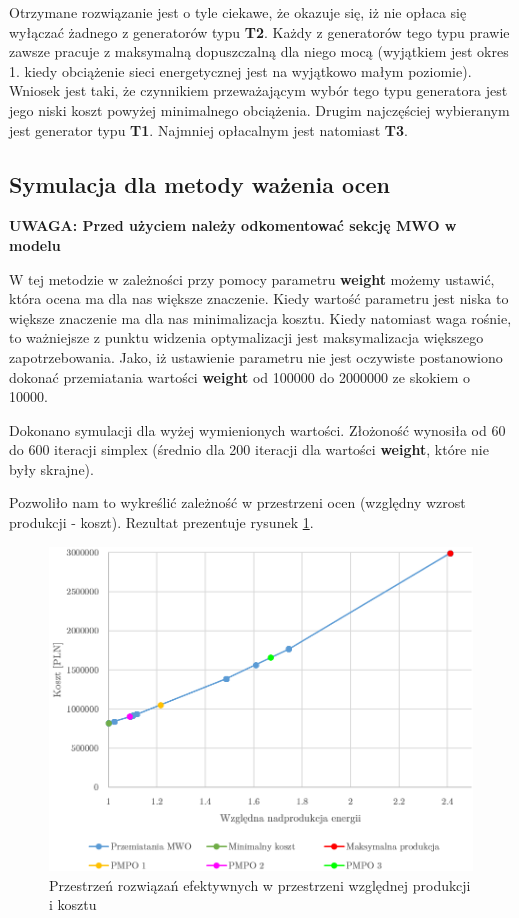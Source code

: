 \documentclass[12pt, twoside, hidelinks, a4paper]{article}
\begin{document}
Otrzymane rozwiązanie jest o tyle ciekawe, że okazuje się, iż nie opłaca się wyłączać żadnego z generatorów typu \textbf{T2}. Każdy z generatorów tego typu prawie zawsze pracuje z maksymalną dopuszczalną dla niego mocą (wyjątkiem jest okres 1. kiedy obciążenie sieci energetycznej jest na wyjątkowo małym poziomie). Wniosek jest taki, że czynnikiem przeważającym wybór tego typu generatora jest jego niski koszt powyżej minimalnego obciążenia. Drugim najczęściej wybieranym jest generator typu \textbf{T1}. Najmniej opłacalnym jest natomiast \textbf{T3}.

\subsection{Symulacja dla metody ważenia ocen} \label{sec:weight}
\textbf{UWAGA: Przed użyciem należy odkomentować sekcję MWO w modelu}

W tej metodzie w zależności przy pomocy parametru \textbf{weight} możemy ustawić, która ocena ma dla nas większe znaczenie. Kiedy wartość parametru jest niska to większe znaczenie ma dla nas minimalizacja kosztu. Kiedy natomiast waga rośnie, to ważniejsze z punktu widzenia optymalizacji jest maksymalizacja większego zapotrzebowania. Jako, iż ustawienie parametru nie jest oczywiste postanowiono dokonać przemiatania wartości \textbf{weight} od 100000 do 2000000 ze skokiem o 10000.

Dokonano symulacji dla wyżej wymienionych wartości. Złożoność wynosiła od 60 do 600 iteracji simplex (średnio dla 200 iteracji dla wartości \textbf{weight}, które nie były skrajne).

Pozwoliło nam to wykreślić zależność w przestrzeni ocen (względny wzrost produkcji - koszt). Rezultat prezentuje rysunek \ref{fig:plot}.

\begin{figure}[H]
\centering
\includegraphics[scale=0.4]{plot_new.png}
\caption{Przestrzeń rozwiązań efektywnych w przestrzeni względnej produkcji i kosztu}
\label{fig:plot}
\end{figure}
\end{document}
